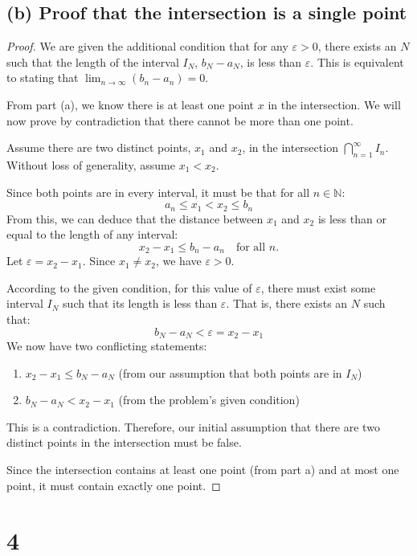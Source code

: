\documentclass[12pt,a4paper]{article}
\theoremstyle{definition}
\theoremstyle{remark}
\begin{document}
\subsection*{(b) Proof that the intersection is a single point}

\begin{proof}
We are given the additional condition that for any $\varepsilon > 0$, there exists an $N$ such that the length of the interval $I_N$, $b_N - a_N$, is less than $\varepsilon$. This is equivalent to stating that $\lim_{n\to\infty}(b_n - a_n) = 0$.

From part (a), we know there is at least one point $x$ in the intersection. We will now prove by contradiction that there cannot be more than one point.

Assume there are two distinct points, $x_1$ and $x_2$, in the intersection $\bigcap_{n=1}^{\infty} I_n$. Without loss of generality, assume $x_1 < x_2$.

Since both points are in every interval, it must be that for all $n \in \mathbb{N}$:
\[ a_n \le x_1 < x_2 \le b_n \]
From this, we can deduce that the distance between $x_1$ and $x_2$ is less than or equal to the length of any interval:
\[ x_2 - x_1 \le b_n - a_n \quad \text{for all } n. \]
Let $\varepsilon = x_2 - x_1$. Since $x_1 \neq x_2$, we have $\varepsilon > 0$.

According to the given condition, for this value of $\varepsilon$, there must exist some interval $I_N$ such that its length is less than $\varepsilon$. That is, there exists an $N$ such that:
\[ b_N - a_N < \varepsilon = x_2 - x_1 \]
We now have two conflicting statements:
\begin{enumerate}
    \item $x_2 - x_1 \le b_N - a_N$ (from our assumption that both points are in $I_N$)
    \item $b_N - a_N < x_2 - x_1$ (from the problem's given condition)
\end{enumerate}
This is a contradiction. Therefore, our initial assumption that there are two distinct points in the intersection must be false.

Since the intersection contains at least one point (from part a) and at most one point, it must contain exactly one point.
\end{proof}


\section*{4}
\end{document}
